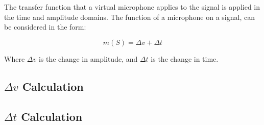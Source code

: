 The transfer function that a virtual microphone applies to the signal is applied in the time and amplitude domains. The function of a microphone on a signal, can be considered in the form:

\begin{equation}
	m(S) = \Delta{}v + \Delta{}t
\end{equation}

Where $\Delta v$ is the change in amplitude, and $\Delta t$ is the change in time.

\subsection{$\Delta{}v$ Calculation}



\subsection{$\Delta{}t$ Calculation}



